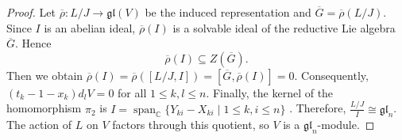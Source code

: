 \documentclass[10pt,a4paper]{amsart}
\begin{document}
\begin{proof}
Let
$\overline{\rho}\colon L/J\rightarrow\mathfrak{gl}(V)$
be the induced representation and
$\overline{G}=\overline{\rho}(L/J)$.
Since \(I\) is an abelian ideal, \(\overline{\rho}(I)\) is a solvable
ideal of the reductive Lie algebra \(\overline{G}\). Hence
\[
\overline{\rho}(I)\subseteq Z(\overline{G}).
\]
Then we obtain
$\overline{\rho}(I)
 =
 \overline{\rho}([L/J,I])
 =
 [\overline{G},\overline{\rho}(I)]
 =
 0$.
Consequently,
$(t_k-1-x_k)d_lV=0$ for all $1\leq k,l\leq n$.
Finally, the kernel of the homomorphism \(\pi_2\) is
$ I=
\operatorname{span}_{\mathbb C}
\{Y_{ki}-X_{ki}\mid 1\leq k,i\leq n\}$ .
Therefore, $\frac{L/J}{I}\cong\mathfrak{gl}_n$.
The action of \(L\) on \(V\) factors through this quotient, so \(V\)
is a \(\mathfrak{gl}_n\)-module.
\end{proof}
\end{document}
